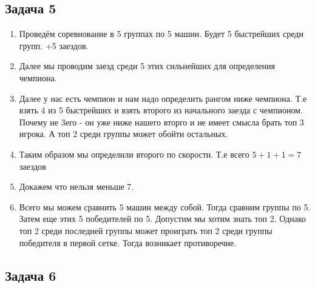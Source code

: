 \documentclass[a4paper,12pt]{article}
\begin{document}
\subsection{Задача 5}
\begin{enumerate}
    \item Проведём соревнование в 5 группах по 5 машин. Будет 5 быстрейших среди групп. +5 заездов.
    \item Далее мы проводим заезд среди 5 этих сильнейших для определения чемпиона.
    \item Далее у нас есть чемпион и нам надо определить рангом ниже чемпиона. Т.е взять 4 из 5 быстрейших и взять второго из начального заезда с чемпионом. Почему не 3его - он уже ниже нашего вторго и не имеет смысла брать топ 3 игрока. А топ 2 среди группы может обойти остальных.
    \item Таким образом мы определили второго по скорости. Т.е всего $5+1+1=7 $ заездов
    \item Докажем что нельзя меньше 7.
    \item Всего мы можем сравнить 5 машин между собой. Тогда сравним группы по 5. Затем еще этих 5 победителей по 5. Допустим мы хотим знать топ 2. Однако топ 2 среди последней группы может проиграть топ 2 среди группы победителя в первой сетке. Тогда возникает противоречие.
\end{enumerate}

\subsection{Задача 6}
\end{document}
